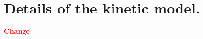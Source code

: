 \documentclass[journal=jacsat,manuscript=article,layout=twocolumn]{achemso}
\newcommand*{\ga}{\alpha}
\newcommand*{\pt}[1]{\left( #1\right)}
\newcommand*{\red}[1]{\textcolor{red}{#1}}
\newcommand*{\blue}[1]{\textcolor{blue}{#1}}
\begin{document}
\section{Details of the kinetic model.}
\red{\textbf{Change}}

% 
% 
% 
% 
% 
\end{document}
